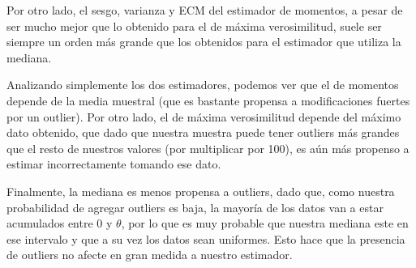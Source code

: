 \documentclass[a4paper]{article}
\begin{document}
Por otro lado, el sesgo, varianza y ECM del estimador de momentos, a pesar de ser mucho mejor que lo obtenido para el de máxima verosimilitud, suele ser siempre un orden más grande que los obtenidos para el estimador que utiliza la mediana. 

Analizando simplemente los dos estimadores, podemos ver que el de momentos depende de la media muestral (que es bastante propensa a modificaciones fuertes por un outlier). Por otro lado, el de máxima verosimilitud depende del máximo dato obtenido, que dado que nuestra muestra puede tener outliers más grandes que el resto de nuestros valores (por multiplicar por 100), es aún más propenso a estimar incorrectamente tomando ese dato. 

Finalmente, la mediana es menos propensa a outliers, dado que, como nuestra probabilidad de agregar outliers es baja, la mayoría de los datos van a estar acumulados entre $0$ y $\theta$, por lo que es muy probable que nuestra mediana este en ese intervalo y que a su vez los datos sean uniformes. Esto hace que la presencia de outliers no afecte en gran medida a nuestro estimador. 


\end{document}
